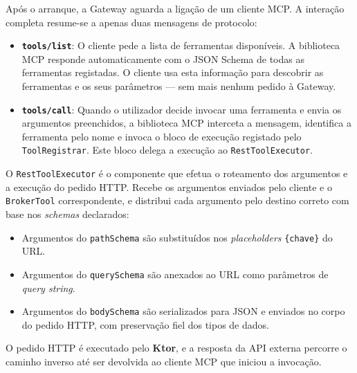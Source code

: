 Após o arranque, a Gateway aguarda a ligação de um cliente MCP. A interação completa resume-se a apenas duas mensagens de protocolo:

\begin{itemize}
    \item \textbf{\texttt{tools/list}}: O cliente pede a lista de ferramentas disponíveis. A biblioteca MCP responde automaticamente com o JSON Schema de todas as ferramentas registadas. O cliente usa esta informação para descobrir as ferramentas e os seus parâmetros — sem mais nenhum pedido à Gateway.

    \item \textbf{\texttt{tools/call}}: Quando o utilizador decide invocar uma ferramenta e envia os argumentos preenchidos, a biblioteca MCP interceta a mensagem, identifica a ferramenta pelo nome e invoca o bloco de execução registado pelo \texttt{ToolRegistrar}. Este bloco delega a execução ao \texttt{RestToolExecutor}.
\end{itemize}

O \texttt{RestToolExecutor} é o componente que efetua o roteamento dos argumentos e a execução do pedido HTTP. Recebe os argumentos enviados pelo cliente e o \texttt{BrokerTool} correspondente, e distribui cada argumento pelo destino correto com base nos \textit{schemas} declarados:

\begin{itemize}
    \item Argumentos do \texttt{pathSchema} são substituídos nos \textit{placeholders} \texttt{\{chave\}} do URL.
    \item Argumentos do \texttt{querySchema} são anexados ao URL como parâmetros de \textit{query string}.
    \item Argumentos do \texttt{bodySchema} são serializados para JSON e enviados no corpo do pedido HTTP, com preservação fiel dos tipos de dados.
\end{itemize}

O pedido HTTP é executado pelo \textbf{Ktor}, e a resposta da API externa percorre o caminho inverso até ser devolvida ao cliente MCP que iniciou a invocação.

